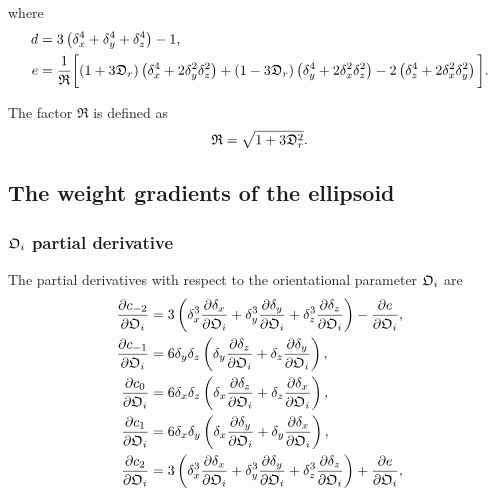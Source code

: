 \noindent where
\begin{align}
 d &= 3 \left( \delta_x^4 + \delta_y^4 + \delta_z^4 \right) - 1, \\
 e &= \frac{1}{\mathfrak{R}} \bigg[ (1 + 3\mathfrak{D}_r) \left(\delta_x^4 + 2\delta_y^2\delta_z^2\right)
   + (1 - 3\mathfrak{D}_r) \left(\delta_y^4 + 2\delta_x^2\delta_z^2\right) - 2 \left(\delta_z^4 + 2\delta_x^2\delta_y^2\right) \bigg].
\end{align}

\noindent The factor $\mathfrak{R}$ is defined as
\begin{equation} \label{eq: R}
 \mathfrak{R} = \sqrt{1 + 3\mathfrak{D}_r^2}.
\end{equation}




\subsection{The weight gradients of the ellipsoid}


\subsubsection{$\mathfrak{O}_i$ partial derivative}

The partial derivatives with respect to the orientational parameter $\mathfrak{O}_i$ are
\begin{subequations}
\begin{align}
    \frac{\partial c_{-2}}{\partial \mathfrak{O}_i} &= 3 \left( \delta_x^3 \frac{\partial \delta_x}{\partial \mathfrak{O}_i}  +  \delta_y^3 \frac{\partial \delta_y}{\partial \mathfrak{O}_i}  +  \delta_z^3 \frac{\partial \delta_z}{\partial \mathfrak{O}_i} \right) - \frac{\partial e}{\partial \mathfrak{O}_i}, \\
    \frac{\partial c_{-1}}{\partial \mathfrak{O}_i} &= 6 \delta_y \delta_z \left( \delta_y \frac{\partial \delta_z}{\partial \mathfrak{O}_i}  +  \delta_z \frac{\partial \delta_y}{\partial \mathfrak{O}_i} \right), \\
    \frac{\partial c_{0}}{\partial \mathfrak{O}_i}  &= 6 \delta_x \delta_z \left( \delta_x \frac{\partial \delta_z}{\partial \mathfrak{O}_i}  +  \delta_z \frac{\partial \delta_x}{\partial \mathfrak{O}_i} \right), \\
    \frac{\partial c_{1}}{\partial \mathfrak{O}_i}  &= 6 \delta_x \delta_y \left( \delta_x \frac{\partial \delta_y}{\partial \mathfrak{O}_i}  +  \delta_y \frac{\partial \delta_x}{\partial \mathfrak{O}_i} \right), \\
    \frac{\partial c_{2}}{\partial \mathfrak{O}_i}  &= 3 \left( \delta_x^3 \frac{\partial \delta_x}{\partial \mathfrak{O}_i}  +  \delta_y^3 \frac{\partial \delta_y}{\partial \mathfrak{O}_i}  +  \delta_z^3 \frac{\partial \delta_z}{\partial \mathfrak{O}_i} \right) + \frac{\partial e}{\partial \mathfrak{O}_i},
\end{align}
\end{subequations}

